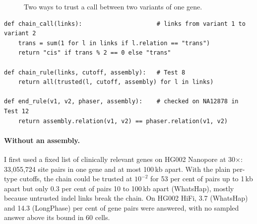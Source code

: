 \documentclass[11pt]{article}
\begin{document}
\begin{figure}[h]
\centering
{}
\caption{Two ways to trust a call between two variants of one gene.}
\label{fig:chain}
\end{figure}

\begin{lstlisting}
def chain_call(links):                     # links from variant 1 to variant 2
    trans = sum(1 for l in links if l.relation == "trans")
    return "cis" if trans % 2 == 0 else "trans"

def chain_rule(links, cutoff, assembly):   # Test 8
    return all(trusted(l, cutoff, assembly) for l in links)

def end_rule(v1, v2, phaser, assembly):    # checked on NA12878 in Test 12
    return assembly.relation(v1, v2) == phaser.relation(v1, v2)
\end{lstlisting}

\paragraph{Without an assembly.} I first used a fixed list of
clinically relevant genes on HG002 Nanopore at 30$\times$: 33{,}055{,}724
site pairs in one gene and at most 100\,kb apart. With the plain per-type
cutoffs, the chain could be trusted at $10^{-2}$ for 53 per cent of pairs up
to 1\,kb apart but only 0.3 per cent of pairs 10 to 100\,kb apart (WhatsHap),
mostly because untrusted indel links break the chain. On HG002 HiFi, 3.7
(WhatsHap) and 14.3 (LongPhase) per cent of gene pairs were answered, with
no sampled answer above its bound in 60 cells.
\end{document}
